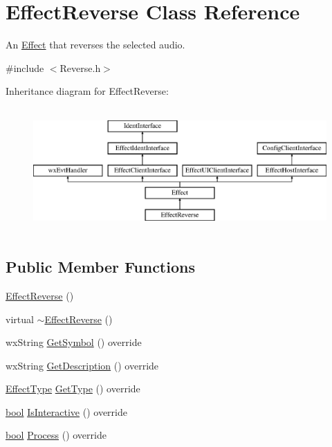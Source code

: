 \hypertarget{class_effect_reverse}{}\section{Effect\+Reverse Class Reference}
\label{class_effect_reverse}


An \hyperlink{class_effect}{Effect} that reverses the selected audio.  




{\ttfamily \#include $<$Reverse.\+h$>$}

Inheritance diagram for Effect\+Reverse\+:\begin{figure}[H]
\begin{center}
\leavevmode
\includegraphics[height=4.794520cm]{class_effect_reverse}
\end{center}
\end{figure}
\subsection*{Public Member Functions}
\begin{DoxyCompactItemize}
\item 
\hyperlink{class_effect_reverse_a653e560a801364dab2c5cf8bd670d955}{Effect\+Reverse} ()
\item 
virtual \hyperlink{class_effect_reverse_ab302c3fb41d6981ed913c77642bedf78}{$\sim$\+Effect\+Reverse} ()
\item 
wx\+String \hyperlink{class_effect_reverse_af9a50ab09022f13540624650558beba2}{Get\+Symbol} () override
\item 
wx\+String \hyperlink{class_effect_reverse_ae0b3048e8b18da3118ac6b9f1c4cabc4}{Get\+Description} () override
\item 
\hyperlink{_effect_interface_8h_a4809a7bb3fd1a421902a667cc1405d43}{Effect\+Type} \hyperlink{class_effect_reverse_a05a81a36e881d0a4c705cfff48157955}{Get\+Type} () override
\item 
\hyperlink{mac_2config_2i386_2lib-src_2libsoxr_2soxr-config_8h_abb452686968e48b67397da5f97445f5b}{bool} \hyperlink{class_effect_reverse_a990717e6d63c01d94c83f3b255a02b64}{Is\+Interactive} () override
\item 
\hyperlink{mac_2config_2i386_2lib-src_2libsoxr_2soxr-config_8h_abb452686968e48b67397da5f97445f5b}{bool} \hyperlink{class_effect_reverse_a933df1a0bb3eeec959863b15483ce814}{Process} () override
\end{DoxyCompactItemize}

